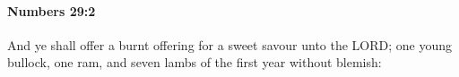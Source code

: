 
		\paragraph{Numbers 29:2} %
			\label{NUMBERS-29-2}

			And ye shall offer a burnt offering for a sweet savour unto the LORD; one young bullock, one ram, and seven lambs of the first year without blemish:


